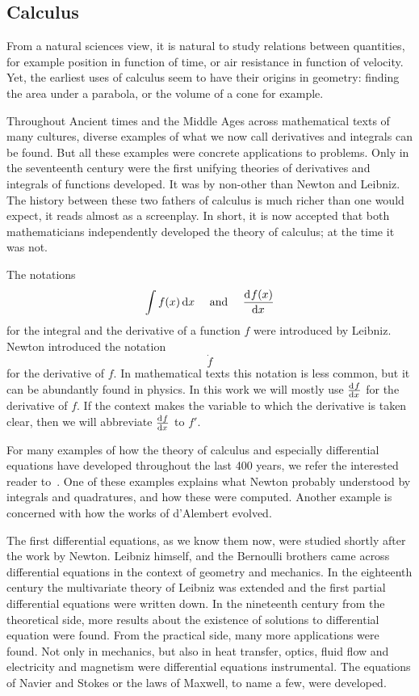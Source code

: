 \subsection{Calculus}

From a natural sciences view, it is natural to study relations between quantities, for example position in function of time, or air resistance in function of velocity. Yet, the earliest uses of calculus seem to have their origins in geometry: finding the area under a parabola, or the volume of a cone for example.

Throughout Ancient times and the Middle Ages across mathematical texts of many cultures, diverse examples of what we now call derivatives and integrals can be found. But all these examples were concrete applications to problems. Only in the seventeenth century were the first unifying theories of derivatives and integrals of functions developed. It was by non-other than Newton and Leibniz. The history between these two fathers of calculus is much richer than one would expect, it reads almost as a screenplay. In short, it is now accepted that both mathematicians independently developed the theory of calculus; at the time it was not.

The notations
$$
    \int f(x) \, \dd x \quad \text{ and } \quad \dv[]{f(x)}{x}
$$
for the integral and the derivative of a function $f$ were introduced by Leibniz. Newton introduced the notation
$$
    \dot{f}
$$
for the derivative of $f$. In mathematical texts this notation is less common, but it can be abundantly found in physics. In this work we will mostly use $\dv[]{f}{x}$ for the derivative of $f$. If the context makes the variable to which the derivative is taken clear, then we will abbreviate $\dv[]{f}{x}$ to $f'$.

For many examples of how the theory of calculus and especially differential equations have developed throughout the last 400 years, we refer the interested reader to~\cite{archibald_history_2005}. One of these examples explains what Newton probably understood by integrals and quadratures, and how these were computed. Another example is concerned with how the works of d'Alembert evolved.


The first differential equations, as we know them now, were studied shortly after the work by Newton. Leibniz himself, and the Bernoulli brothers came across differential equations in the context of geometry and mechanics. In the eighteenth century the multivariate theory of Leibniz was extended and the first partial differential equations were written down. In the nineteenth century from the theoretical side, more results about the existence of solutions to differential equation were found. From the practical side, many more applications were found. Not only in mechanics, but also in heat transfer, optics, fluid flow and electricity and magnetism were differential equations instrumental. The equations of Navier and Stokes or the laws of Maxwell, to name a few, were developed.

